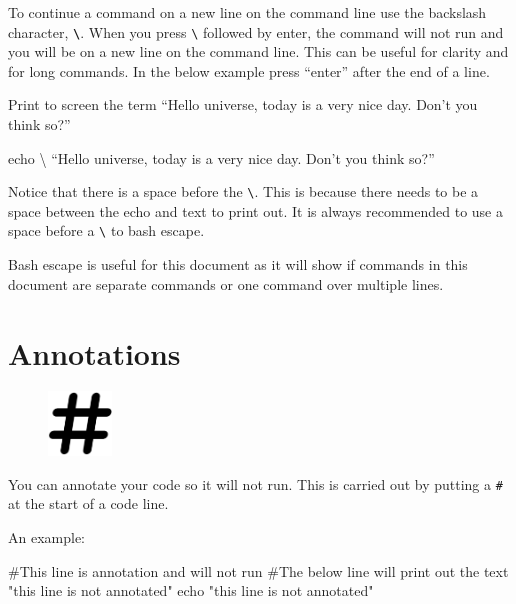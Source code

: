 \documentclass[
  letterpaper,
  DIV=11,
  numbers=noendperiod]{scrreprt}
\newenvironment{Shaded}{\begin{snugshade}}{\end{snugshade}}
\newcommand{\BuiltInTok}[1]{\textcolor[rgb]{0.00,0.23,0.31}{#1}}
\newcommand{\CommentTok}[1]{\textcolor[rgb]{0.37,0.37,0.37}{#1}}
\newcommand{\DataTypeTok}[1]{\textcolor[rgb]{0.68,0.00,0.00}{#1}}
\newcommand{\NormalTok}[1]{\textcolor[rgb]{0.00,0.23,0.31}{#1}}
\newcommand{\PreprocessorTok}[1]{\textcolor[rgb]{0.68,0.00,0.00}{#1}}
\newcommand{\StringTok}[1]{\textcolor[rgb]{0.13,0.47,0.30}{#1}}
\begin{document}
To continue a command on a new line on the command line use the
backslash character, \textbf{\texttt{\textbackslash{}}}. When you press
\texttt{\textbackslash{}} followed by enter, the command will not run
and you will be on a new line on the command line. This can be useful
for clarity and for long commands. In the below example press ``enter''
after the end of a line.

Print to screen the term ``Hello universe, today is a very nice day.
Don't you think so?''

\begin{Shaded}
\begin{Highlighting}[]
\BuiltInTok{echo} \DataTypeTok{\textbackslash{}}
\NormalTok{“Hello universe, today is a very nice day. Don’t you think so}\PreprocessorTok{?}\NormalTok{”}
\end{Highlighting}
\end{Shaded}

Notice that there is a space before the \texttt{\textbackslash{}}. This
is because there needs to be a space between the echo and text to print
out. It is always recommended to use a space before a
\texttt{\textbackslash{}} to bash escape.

Bash escape is useful for this document as it will show if commands in
this document are separate commands or one command over multiple lines.

\hypertarget{annotations}{%
\section{Annotations}\label{annotations}}

\begin{figure}

{\centering \includegraphics[width=0.15\textwidth,height=\textheight]{figures/hashtag.png}

}

\end{figure}

You can annotate your code so it will not run. This is carried out by
putting a \texttt{\#} at the start of a code line.

An example:

\begin{Shaded}
\begin{Highlighting}[]
\CommentTok{\#This line is annotation and will not run}
\CommentTok{\#The below line will print out the text "this line is not annotated"}
\BuiltInTok{echo} \StringTok{"this line is not annotated"}
\end{Highlighting}
\end{Shaded}
\end{document}
